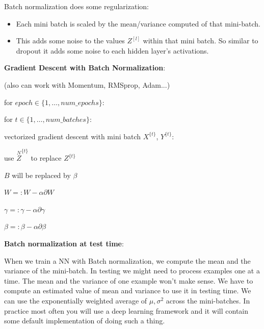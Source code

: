 \documentclass{article}
\begin{document}
\bigskip

\noindent Batch normalization does some regularization:

\begin{itemize}
    \item Each mini batch is scaled by the mean/variance computed of that mini-batch.
    \item This adds some noise to the values \(Z^{[l]}\) within that mini batch. So similar to dropout it adds some noise to each hidden layer's activations.
\end{itemize}

\noindent \textbf{Gradient Descent with Batch Normalization}:

\noindent (also can work with Momentum, RMSprop, Adam...)

\noindent for \(epoch \in \{1, \dots, num\_epochs\}\):

\noindent \hspace{.5cm} for \(t \in \{1, \dots, num\_batches\}\):

\noindent \hspace{1cm} vectorized gradient descent with mini batch \(X^{\{t\}}\), \(Y^{\{t\}}\):

\noindent \hspace{1cm} use \(\overset{N}{Z}^{\{t\}}\) to replace \(Z^{\{t\}}\)

\noindent \hspace{1cm} \(B\) will be replaced by \(\beta\)

\noindent \hspace{1cm} \(W =: W - \alpha \partial W\)

\noindent \hspace{1cm} \(\gamma =: \gamma - \alpha \partial \gamma\)

\noindent \hspace{1cm} \(\beta =: \beta - \alpha \partial \beta\)

\bigskip

\noindent \textbf{Batch normalization at test time}:

\noindent When we train a NN with Batch normalization, we compute the mean and the variance of the mini-batch. In testing we might need to process examples one at a time. The mean and the variance of one example won't make sense. We have to compute an estimated value of mean and variance to use it in testing time. We can use the exponentially weighted average of \(\mu, \sigma^{2}\) across the mini-batches. In practice most often you will use a deep learning framework and it will contain some default implementation of doing such a thing.
\end{document}
